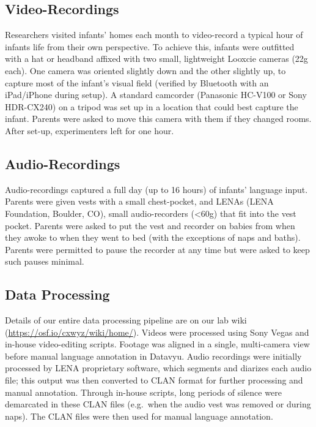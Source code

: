 \documentclass[floatsintext,man]{apa6}
\theoremstyle{definition}
\theoremstyle{definition}
\theoremstyle{definition}
\theoremstyle{remark}
\begin{document}
\subsection{Video-Recordings}\label{video-recordings}

Researchers visited infants' homes each month to video-record a typical
hour of infants life from their own perspective. To achieve this,
infants were outfitted with a hat or headband affixed with two small,
lightweight Looxcie cameras (22g each). One camera was oriented slightly
down and the other slightly up, to capture most of the infant's visual
field (verified by Bluetooth with an iPad/iPhone during setup). A
standard camcorder (Panasonic HC-V100 or Sony HDR-CX240) on a tripod was
set up in a location that could best capture the infant. Parents were
asked to move this camera with them if they changed rooms. After set-up,
experimenters left for one hour.

\subsection{Audio-Recordings}\label{audio-recordings}

Audio-recordings captured a full day (up to 16 hours) of infants'
language input. Parents were given vests with a small chest-pocket, and
LENAs (LENA Foundation, Boulder, CO), small audio-recorders
(\textless{}60g) that fit into the vest pocket. Parents were asked to
put the vest and recorder on babies from when they awoke to when they
went to bed (with the exceptions of naps and baths). Parents were
permitted to pause the recorder at any time but were asked to keep such
pauses minimal.

\subsection{Data Processing}\label{data-processing}

Details of our entire data processing pipeline are on our lab wiki
(\url{https://osf.io/cxwyz/wiki/home/}). Videos were processed using
Sony Vegas and in-house video-editing scripts. Footage was aligned in a
single, multi-camera view before manual language annotation in Datavyu.
Audio recordings were initially processed by LENA proprietary software,
which segments and diarizes each audio file; this output was then
converted to CLAN format for further processing and manual annotation.
Through in-house scripts, long periods of silence were demarcated in
these CLAN files (e.g.~when the audio vest was removed or during naps).
The CLAN files were then used for manual language annotation.
\end{document}
